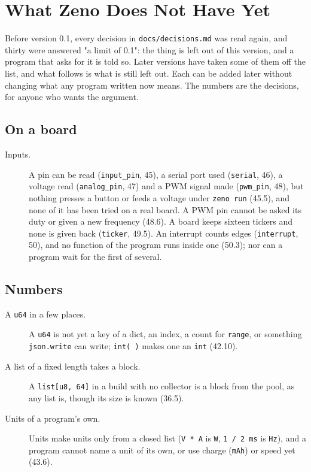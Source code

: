 \chapter{What Zeno Does Not Have Yet}\label{app-limits}

Before version 0.1, every decision in \verb|docs/decisions.md| was read
again, and thirty were answered "a limit of 0.1": the thing is left out
of this version, and a program that asks for it is told so. Later
versions have taken some of them off the list, and what follows is
what is still left out. Each can be added later without changing what any program written now means.
The numbers are the decisions, for anyone who wants the argument.

\section{On a board}

\begin{description}
\item[Inputs.] A pin can be read (\verb|input_pin|, 45), a serial
  port used (\verb|serial|, 46), a voltage read
  (\verb|analog_pin|, 47) and a PWM signal made (\verb|pwm_pin|, 48),
  but nothing presses a button or feeds a
  voltage under \verb|zeno run| (45.5), and none of it has been tried
  on a real board. A PWM pin cannot be asked its duty or given a new
  frequency (48.6). A board keeps sixteen tickers and none is given
  back (\verb|ticker|, 49.5). An interrupt counts edges
  (\verb|interrupt|, 50), and no function of the program runs inside
  one (50.3); nor can a program wait for the first of several.
\end{description}

\section{Numbers}

\begin{description}
\item[A \texttt{u64} in a few places.] A \verb|u64| is not yet a key
  of a dict, an index, a count for \verb|range|, or something
  \verb|json.write| can write; \verb|int( )| makes one an \verb|int|
  (42.10).
\item[A list of a fixed length takes a block.] A \texttt{list[u8, 64]}
  in a build with no collector is a block from the pool, as any list is,
  though its size is known (36.5).
\item[Units of a program's own.] Units make units only from a closed
  list (\verb|V * A| is \verb|W|, \verb|1 / 2 ms| is \verb|Hz|), and a
  program cannot name a unit of its own, or use charge (\verb|mAh|) or
  speed yet (43.6).
\end{description}

